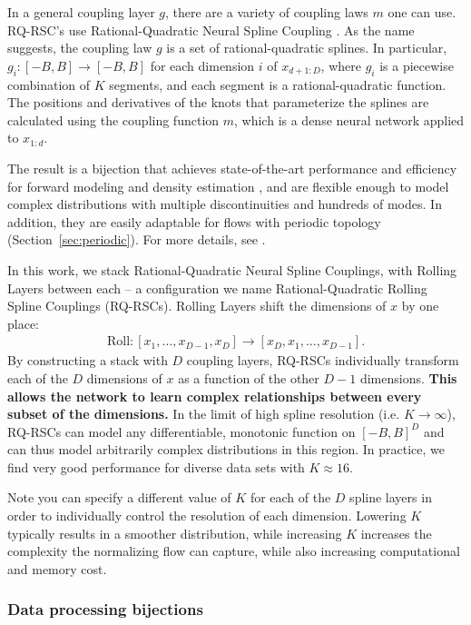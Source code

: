 \documentclass[twocolumn,twocolappendix]{aastex631}
\begin{document}
In a general coupling layer $g$, there are a variety of coupling laws $m$ one can use.
RQ-RSC's use Rational-Quadratic Neural Spline Coupling \citep{durkan2019}.
As the name  suggests, the coupling law $g$ is a set of rational-quadratic splines.
In particular, $g_i: [-B, B] \to [-B, B]$ for each dimension $i$ of $x_{d+1:D}$, where $g_i$ is a piecewise combination of $K$ segments, and each segment is a rational-quadratic function.
The positions and derivatives of the knots that parameterize the splines are calculated using the coupling function $m$, which is a dense neural network applied to $x_{1:d}$.

The result is a bijection that achieves state-of-the-art performance and efficiency for forward modeling and density estimation \citep{kobyzev2020}, and are flexible enough to model complex distributions with multiple discontinuities and hundreds of modes.
In addition, they are easily adaptable for flows with periodic topology (Section~\ref{sec:periodic}).
For more details, see \citet{durkan2019}.

In this work, we stack Rational-Quadratic Neural Spline Couplings, with Rolling Layers between each -- a configuration we name Rational-Quadratic Rolling Spline Couplings (RQ-RSCs).
Rolling Layers shift the dimensions of $x$ by one place:
\begin{align}
    \mathrm{Roll}: [x_1, \dots , x_{D-1}, x_D] \to [x_D, x_1, \dots , x_{D-1}].
\end{align}
By constructing a stack with $D$ coupling layers, RQ-RSCs individually transform each of the $D$ dimensions of $x$ as a function of the other $D-1$ dimensions.
\textbf{This allows the network to learn complex relationships between every subset of the dimensions.}
In the limit of high spline resolution (i.e. $K \to \infty$), RQ-RSCs can model any differentiable, monotonic function on $[-B, B]^D$ and can thus model arbitrarily complex distributions in this region.
In practice, we find very good performance for diverse data sets with $K \approx 16$.

Note you can specify a different value of $K$ for each of the $D$ spline layers in order to individually control the resolution of each dimension.
Lowering $K$ typically results in a smoother distribution, while increasing $K$ increases the complexity the normalizing flow can capture, while also increasing computational and memory cost.

\subsubsection{Data processing bijections}
\label{sec:data-processing}
\end{document}
